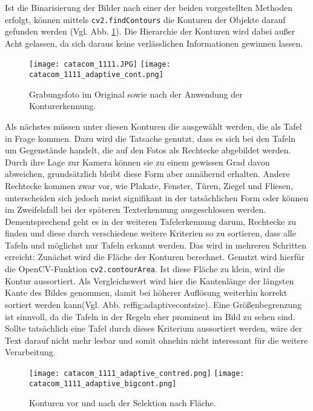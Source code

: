 Ist die Binarisierung der Bilder nach einer der beiden vorgestellten Methoden erfolgt, können mittels \verb|cv2.findContours| die Konturen der Objekte darauf gefunden werden (Vgl. Abb. \ref{fig:adaptivecont}). Die Hierarchie der Konturen wird dabei außer Acht gelassen, da sich daraus keine verlässlichen Informationen gewinnen lassen.
\begin{figure}[h!]
\texttt{[image: catacom\_1111.JPG]}
\texttt{[image: catacom\_1111\_adaptive\_cont.png]}
\caption{Grabungsfoto im Original sowie nach der Anwendung der Konturerkennung.}
\label{fig:adaptivecont}
\end{figure}
Als nächstes müssen unter diesen Konturen die ausgewählt werden, die als Tafel in Frage kommen. Dazu wird die Tatsache genutzt, dass es sich bei den Tafeln um Gegenstände handelt, die auf den Fotos als Rechtecke abgebildet werden. Durch ihre Lage zur Kamera können sie zu einem gewissen Grad davon abweichen, grundsätzlich bleibt diese Form aber annähernd erhalten. Andere Rechtecke kommen zwar vor, wie Plakate, Fenster, Türen, Ziegel und Fliesen, unterscheiden sich jedoch meist signifikant in der tatsächlichen Form oder können im Zweifelsfall bei der späteren Texterkennung ausgeschlossen werden. Dementsprechend geht es in der weiteren Tafelerkennung darum, Rechtecke zu finden und diese durch verschiedene weitere Kriterien so zu sortieren, dass alle Tafeln und möglichst nur Tafeln erkannt werden. Das wird in mehreren Schritten erreicht:
Zunächst wird die Fläche der Konturen berechnet. Genutzt wird hierfür die OpenCV-Funktion \verb|cv2.contourArea|. Ist diese Fläche zu klein, wird die Kontur aussortiert. Als Vergleichswert wird hier die Kantenlänge der längsten Kante des Bildes genommen, damit bei höherer Auflösung weiterhin korrekt sortiert werden kann(Vgl. Abb. ref{fig:adaptivecontsize}). Eine Größenbegrenzung ist sinnvoll, da die Tafeln in der Regeln eher prominent im Bild zu sehen sind. Sollte tatsächlich eine Tafel durch dieses Kriterium aussortiert werden, wäre der Text darauf nicht mehr lesbar und somit ohnehin nicht interessant für die weitere Verarbeitung.
\begin{figure}[h!]
\texttt{[image: catacom\_1111\_adaptive\_contred.png]}
\texttt{[image: catacom\_1111\_adaptive\_bigcont.png]}
\caption{Konturen vor und nach der Selektion nach Fläche.}
\label{fig:adaptivecontsize}
\end{figure}

